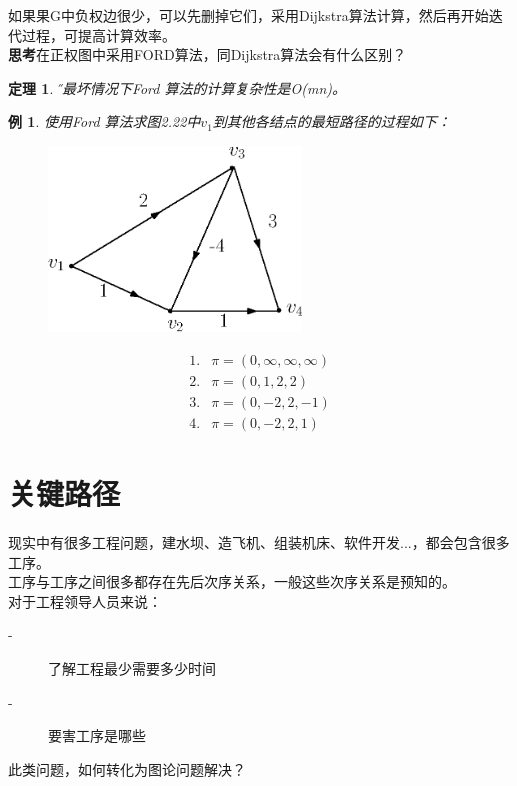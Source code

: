 \documentclass[11pt,a4paper,openany]{book}
\newtheorem{theorem}{\textbf{定理}}[section]
\newtheorem{sample}{\textbf{例}}[section]
\begin{document}
如果果G中负权边很少，可以先删掉它们，采用Dijkstra算法计算，然后再开始迭代过程，可提高计算效率。\\
\textbf{思考}在正权图中采用FORD算法，同Dijkstra算法会有什么区别？\\
\begin{theorem}\H
在最坏情况下Ford 算法的计算复杂性是O(mn)。
\end{theorem}
\begin{sample}\K
使用Ford 算法求图2.22中$v_1$到其他各结点的最短路径的过程如下：\\
\begin{figure}[H]
  \centering
  \includegraphics[width=0.6\textwidth]{2_22.eps}\\
  \caption{}
\end{figure}
\begin{flushleft}
  \begin{align*}
  1. &  \pi=(0,\infty,\infty,\infty)\\
  2. &  \pi=(0,1,2,2)\\
  3. & \pi=(0,-2,2,-1)\\
  4. & \pi=(0,-2,2,1)
\end{align*}
\end{flushleft}
\end{sample}
\section{关键路径}
\paragraph{}现实中有很多工程问题，建水坝、造飞机、组装机床、软件开发...，都会包含很多工序。\\
工序与工序之间很多都存在先后次序关系，一般这些次序关系是预知的。\\
对于工程领导人员来说：\\
\begin{description}
  \item[-] 了解工程最少需要多少时间
  \item[-] 要害工序是哪些
\end{description}
此类问题，如何转化为图论问题解决？\\
\end{document}
